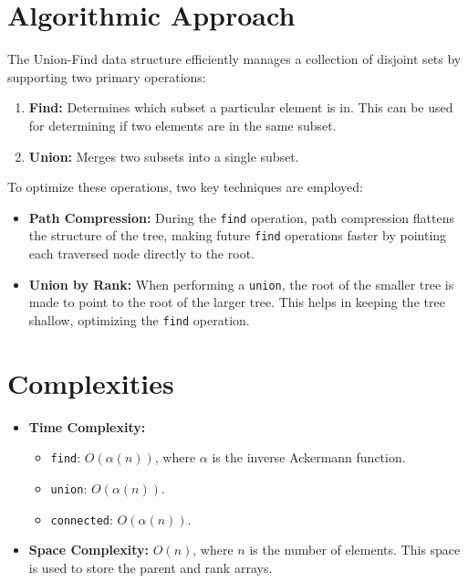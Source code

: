 \section*{Algorithmic Approach}

The Union-Find data structure efficiently manages a collection of disjoint sets by supporting two primary operations:

\begin{enumerate}
    \item \textbf{Find:} Determines which subset a particular element is in. This can be used for determining if two elements are in the same subset.
    
    \item \textbf{Union:} Merges two subsets into a single subset.
\end{enumerate}

To optimize these operations, two key techniques are employed:

\begin{itemize}
    \item \textbf{Path Compression:} During the \texttt{find} operation, path compression flattens the structure of the tree, making future \texttt{find} operations faster by pointing each traversed node directly to the root.
    
    \item \textbf{Union by Rank:} When performing a \texttt{union}, the root of the smaller tree is made to point to the root of the larger tree. This helps in keeping the tree shallow, optimizing the \texttt{find} operation.
\end{itemize}


\section*{Complexities}

\begin{itemize}
    \item \textbf{Time Complexity:}
    \begin{itemize}
        \item \texttt{find}: \(O(\alpha(n))\), where \(\alpha\) is the inverse Ackermann function.
        \item \texttt{union}: \(O(\alpha(n))\).
        \item \texttt{connected}: \(O(\alpha(n))\).
    \end{itemize}
    \item \textbf{Space Complexity:} \(O(n)\), where \(n\) is the number of elements. This space is used to store the parent and rank arrays.
\end{itemize}

